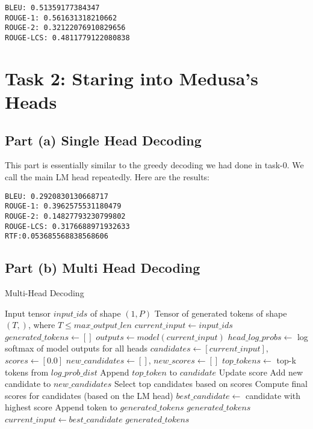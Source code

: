 \documentclass[a4paper,12pt]{article}
\begin{document}
\begin{verbatim}
BLEU: 0.51359177384347
ROUGE-1: 0.561631318210662
ROUGE-2: 0.32122076910829656
ROUGE-LCS: 0.4811779122080838
\end{verbatim}

\section{Task 2: Staring into Medusa's Heads}

\subsection{Part (a) Single Head Decoding}
This part is essentially similar to the greedy decoding we had done in task-0. We call the main LM head repeatedly. Here are the results:

\begin{verbatim}
BLEU: 0.2920830130668717
ROUGE-1: 0.3962575531180479
ROUGE-2: 0.14827793230799802
ROUGE-LCS: 0.3176688971932633
RTF:0.053685568838568606
\end{verbatim}

\subsection{Part (b) Multi Head Decoding}
\begin{algorithm}
  \caption{Multi-Head Decoding}
  \begin{algorithmic}[1]
  \Require Input tensor $input\_ids$ of shape $(1, P)$
  \Ensure Tensor of generated tokens of shape $(T,)$, where $T \leq max\_output\_len$
  \State $current\_input \gets input\_ids$
  \State $generated\_tokens \gets []$
      \State $outputs \gets model(current\_input)$
      \State $head\_log\_probs \gets$ log softmax of model outputs for all heads
      \State $candidates \gets [current\_input]$, $scores \gets [0.0]$
          \State $new\_candidates \gets []$, $new\_scores \gets []$
              \State $top\_tokens \gets$ top-k tokens from $log\_prob\_dist$
                  \State Append $top\_token$ to $candidate$
                  \State Update score
                  \State Add new candidate to $new\_candidates$
              \EndFor
          \EndFor
          \State Select top candidates based on scores
      \EndFor
      \State Compute final scores for candidates (based on the LM head)
      \State $best\_candidate \gets$ candidate with highest score
          \State Append token to $generated\_tokens$
              \State \Return $generated\_tokens$
          \EndIf
      \EndFor
      \State $current\_input \gets best\_candidate$
  \EndWhile
  \State \Return $generated\_tokens$
  \end{algorithmic}
  \end{algorithm}
\end{document}
